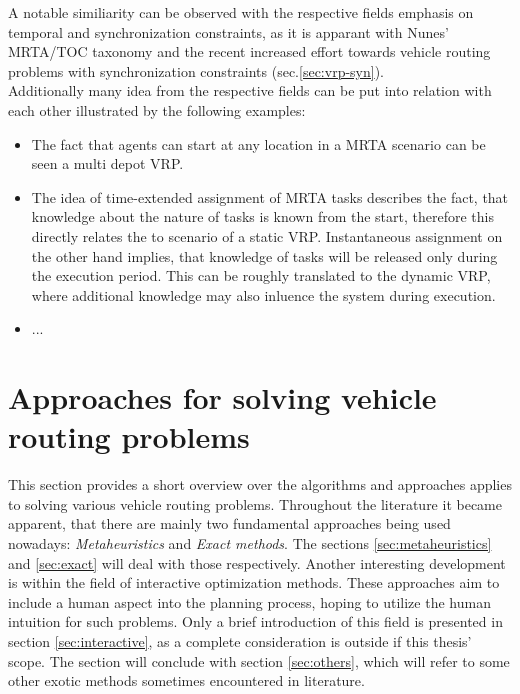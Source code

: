 A notable similiarity can be observed with the respective fields emphasis on temporal and synchronization constraints, as it is apparant with Nunes' MRTA/TOC taxonomy \cite{nunes_taxonomy_2017} and the recent increased effort towards vehicle routing problems with synchronization constraints (sec.\ref{sec:vrp-syn}).\\
Additionally many idea from the respective fields can be put into relation with each other illustrated by the following examples:
\begin{itemize}
\item The fact that agents can start at any location in a MRTA scenario can be seen a multi depot VRP.
\item The idea of time-extended assignment of MRTA tasks describes the fact, that knowledge about the nature of tasks is known from the start, therefore this directly relates the to scenario of a static VRP. Instantaneous assignment on the other hand implies, that knowledge of tasks will be released only during the execution period. This can be roughly translated to the dynamic VRP, where additional knowledge may also inluence the system during execution.
\item ...
\end{itemize}

\newpage

\section{Approaches for solving vehicle routing problems}\label{sec:vrp-approaches}

This section provides a short overview over the algorithms and approaches applies to solving various vehicle routing problems. Throughout the literature it became apparent, that there are mainly two fundamental approaches being used nowadays: \textit{Metaheuristics} and \textit{Exact methods}. The sections \ref{sec:metaheuristics} and \ref{sec:exact} will deal with those respectively. Another interesting development is within the field of interactive optimization methods. These approaches aim to include a human aspect into the planning process, hoping to utilize the human intuition for such problems. Only a brief introduction of this field is presented in section \ref{sec:interactive}, as a complete consideration is outside if this thesis' scope. The section will conclude with section \ref{sec:others}, which will refer to some other exotic methods sometimes encountered in literature.

